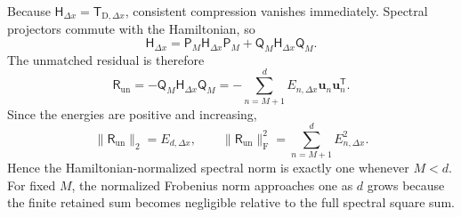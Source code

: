 \documentclass[11pt]{article}
\newcommand{\fro}{\mathrm{F}}
\newcommand{\mat}[1]{\mathsf{#1}}
\newcommand{\vect}[1]{\boldsymbol{#1}}
\begin{document}
Because $\mat{H}_{\Delta x}=\mat{T}_{\mathrm{D},\Delta x}$, consistent compression
vanishes immediately. Spectral projectors commute with the Hamiltonian, so
\begin{equation}
 \mat{H}_{\Delta x}
 =\mat{P}_M\mat{H}_{\Delta x}\mat{P}_M
 +\mat{Q}_M\mat{H}_{\Delta x}\mat{Q}_M.
\end{equation}
The unmatched residual is therefore
\begin{equation}
 \mat{R}_{\mathrm{un}}
 =-\mat{Q}_M\mat{H}_{\Delta x}\mat{Q}_M
 =-\sum_{n=M+1}^{d}E_{n,\Delta x}
   \vect{u}_n\vect{u}_n^{\mathsf T}.
 \label{eq:appendix-unmatched-spectral-form}
\end{equation}
Since the energies are positive and increasing,
\begin{equation}
 \lVert\mat{R}_{\mathrm{un}}\rVert_2=E_{d,\Delta x},
 \qquad
 \lVert\mat{R}_{\mathrm{un}}\rVert_{\fro}^2
 =\sum_{n=M+1}^{d}E_{n,\Delta x}^2.
 \label{eq:appendix-unmatched-norms}
\end{equation}
Hence the Hamiltonian-normalized spectral norm is exactly one whenever $M<d$.
For fixed $M$, the normalized Frobenius norm approaches one as $d$ grows because the
finite retained sum becomes negligible relative to the full spectral square sum.
\end{document}
